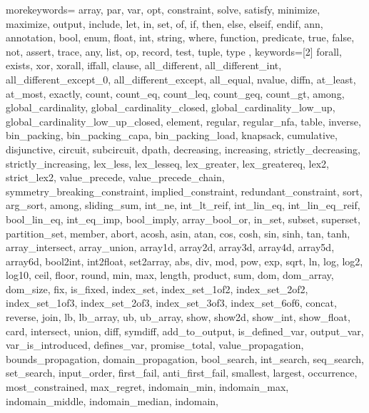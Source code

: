 \usepackage{listings}
\usepackage{courier} %

\newcommand\mznfont{\fontfamily{pcr}\selectfont}

{
  morekeywords={
  array, par, var, opt, constraint, solve, satisfy, minimize,
  maximize, output, include, let, in, set, of, if, then, else, elseif, endif,
  ann, annotation, bool, enum, float, int, string, where, function,
  predicate, true, false, not, assert, trace,
  any, list, op, record, test, tuple, type
  },
  keywords=[2]{
  forall, exists, xor, xorall, iffall, clause,
  all_different, all_different_int,
  all_different_except_0, all_different_except, all_equal,
  nvalue, diffn,
  at_least, at_most, exactly, %
  count, count_eq, count_leq, count_geq, count_gt, among,
  global_cardinality, global_cardinality_closed,
  global_cardinality_low_up, global_cardinality_low_up_closed,
  element, regular, regular_nfa, table, inverse,
  bin_packing, bin_packing_capa, bin_packing_load, knapsack,
  cumulative, disjunctive, circuit, subcircuit, dpath,
  decreasing, increasing,
  strictly_decreasing, strictly_increasing,
  lex_less, lex_lesseq, lex_greater, lex_greatereq, lex2, strict_lex2,
  value_precede, value_precede_chain,
  symmetry_breaking_constraint, implied_constraint, redundant_constraint,
  sort, arg_sort, among, sliding_sum,
  int_ne, int_lt_reif, int_lin_eq, int_lin_eq_reif, bool_lin_eq, int_eq_imp,
  bool_imply, array_bool_or,
  in_set, subset, superset, partition_set, member,
  abort,
  acosh, asin, atan, cos, cosh, sin, sinh, tan, tanh,
  array_intersect, array_union,
  array1d, array2d, array3d, array4d, array5d, array6d,
  bool2int, int2float, set2array,
  abs, div, mod, pow, exp, sqrt, ln, log, log2, log10,
  ceil, floor, round,
  min, max, length, product, sum,
  dom, dom_array, dom_size, fix, is_fixed,
  index_set, index_set_1of2, index_set_2of2,
  index_set_1of3, index_set_2of3, index_set_3of3, index_set_6of6,
  concat, reverse, join,
  lb, lb_array, ub, ub_array,
  show, show2d, show_int, show_float,
  card, intersect, union, diff, symdiff,
  add_to_output,
  is_defined_var, output_var, var_is_introduced, defines_var, promise_total,
  value_propagation, bounds_propagation, domain_propagation,
  bool_search, int_search, seq_search,
  set_search, input_order, first_fail, anti_first_fail, smallest,
  largest, occurrence, most_constrained, max_regret, indomain_min,
  indomain_max, indomain_middle, indomain_median, indomain,
}}
